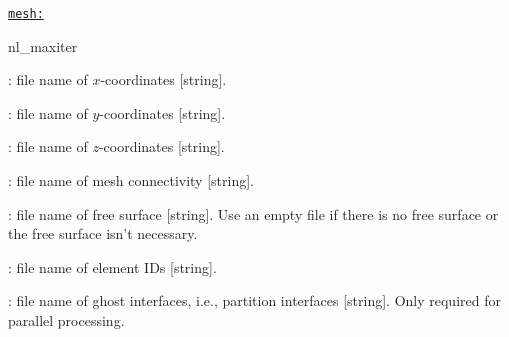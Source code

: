 \texttt{\underline{mesh:}}
\begin{adescription}{nl\_maxiter}
  \item[xfile] : file name of $x$-coordinates [string].
  \item[yfile] : file name of $y$-coordinates [string].
  \item[zfile] : file name of $z$-coordinates [string].
  \item[confile]: file name of mesh connectivity [string].
  \item[fsfile]: file name of free surface [string]. Use an empty file if there is no free surface or the free surface isn't necessary.
  \item[idfile]: file name of element IDs [string].
  \item[gfile]: file name of ghost interfaces, i.e., partition interfaces [string]. Only required for parallel processing.  \\
\end{adescription}

